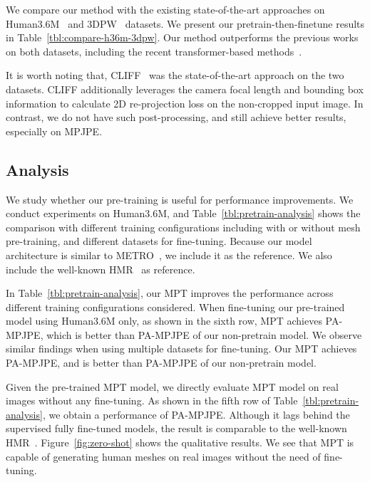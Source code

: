 We compare our method with the existing state-of-the-art approaches on Human3.6M~\cite{ionescu2014human3} and 3DPW~\cite{vonMarcard2018} datasets. We present our pretrain-then-finetune results in Table~\ref{tbl:compare-h36m-3dpw}. Our method outperforms the previous works on both datasets, including the recent transformer-based methods~\cite{lin2020end,lin2021mesh,zanfir2021thundr,cho2022FastMETRO}. 

It is worth noting that, CLIFF~\cite{li2022cliff} was the state-of-the-art approach on the two datasets. CLIFF additionally leverages the camera focal length and bounding box information to calculate 2D re-projection loss on the non-cropped input image. In contrast, we do not have such post-processing, and still achieve better results, especially on MPJPE.


\subsection{Analysis}

 We study whether our pre-training is useful for performance improvements. We conduct experiments on Human3.6M, and Table~\ref{tbl:pretrain-analysis} shows the comparison with different training configurations including with or without mesh pre-training, and different datasets for fine-tuning. Because our model architecture is similar to METRO~\cite{lin2020end}, we include it as the reference. We also include the well-known HMR~\cite{kanazawa2018end} as reference.

In Table~\ref{tbl:pretrain-analysis}, our MPT improves the performance across different training configurations considered. When fine-tuning our pre-trained model using Human3.6M only, as shown in the sixth row, MPT achieves  PA-MPJPE, which is better than  PA-MPJPE of our non-pretrain model. We observe similar findings when using multiple datasets for fine-tuning. Our MPT achieves  PA-MPJPE, and is better than  PA-MPJPE of our non-pretrain model. 



 Given the pre-trained MPT model, we directly evaluate MPT model on real images without any fine-tuning. As shown in the fifth row of Table~\ref{tbl:pretrain-analysis}, we obtain a performance of  PA-MPJPE. Although it lags behind the supervised fully fine-tuned models, the result is comparable to the well-known HMR~\cite{kanazawa2018end}. Figure~\ref{fig:zero-shot} shows the qualitative results. We see that MPT is capable of generating human meshes on real images without the need of fine-tuning.


